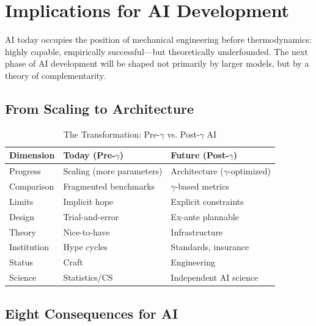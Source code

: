 \section{Implications for AI Development}
\label{sec:thermo-ai}

AI today occupies the position of mechanical engineering before thermodynamics:
highly capable, empirically successful---but theoretically underfounded.
The next phase of AI development will be shaped not primarily by larger models,
but by a theory of complementarity.

\subsection{From Scaling to Architecture}

\begin{table}[htbp]
\centering
\caption{The Transformation: Pre-$\gamma$ vs. Post-$\gamma$ AI}
\label{tab:ai-transformation}
\renewcommand{\arraystretch}{1.3}
\begin{tabular}{@{}lp{5cm}p{5cm}@{}}
\toprule
\textbf{Dimension} & \textbf{Today (Pre-$\gamma$)} & \textbf{Future (Post-$\gamma$)} \\
\midrule
Progress & Scaling (more parameters) & Architecture ($\gamma$-optimized) \\
Comparison & Fragmented benchmarks & $\gamma$-based metrics \\
Limits & Implicit hope & Explicit constraints \\
Design & Trial-and-error & Ex-ante plannable \\
Theory & Nice-to-have & Infrastructure \\
Institution & Hype cycles & Standards, insurance \\
Status & Craft & Engineering \\
Science & Statistics/CS & Independent AI science \\
\bottomrule
\end{tabular}
\end{table}

\subsection{Eight Consequences for AI}


